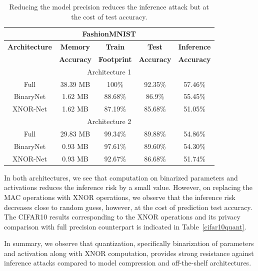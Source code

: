 \begin{table}[!htb]
\begin{center}
\renewcommand\arraystretch{1.5}
\fontsize{6.5pt}{6.5pt}\selectfont
\begin{tabular}{|c|c|c|c|c|}
\hline
\multicolumn{5}{|c|}{\textbf{FashionMNIST}}\\
\hline
\textbf{Architecture} & \textbf{Memory} & \textbf{Train}  & \textbf{Test}  & \textbf{Inference}  \\
 & \textbf{Accuracy} &  \textbf{Footprint} & \textbf{Accuracy} & \textbf{Accuracy}  \\
\hline
\multicolumn{5}{|c|}{Architecture 1}\\
Full & 38.39 MB & 100\% & 92.35\% & \cellcolor{red!25}57.46\%\\
BinaryNet & 1.62 MB & 88.68\% & 86.9\% & \cellcolor{green!25}55.45\%\\
XNOR-Net & 1.62 MB & 87.19\% & 85.68\% & \cellcolor{green!25}51.05\%\\ %
\hline
\multicolumn{5}{|c|}{Architecture 2}\\
Full & 29.83 MB & 99.34\% & 89.88\% & \cellcolor{red!25}54.86\% \\
BinaryNet & 0.93 MB & 97.61\% & 89.60\% & \cellcolor{green!25}54.30\%\\
XNOR-Net & 0.93 MB & 92.67\% & 86.68\% & \cellcolor{green!25}51.74\%\\ %
\hline
\end{tabular}
\end{center}
\caption{Reducing the model precision reduces the inference attack but at the cost of test accuracy.}
\label{fmnist_quantize}
\vspace{-4mm}
\end{table}

In both architectures, we see that computation on  binarized parameters and activations reduces the inference risk by a small value.
However, on replacing the MAC operations with XNOR operations, we observe that the inference risk decreases close to random guess, however, at the cost of prediction test accuracy.
The CIFAR10 results corresponding to the XNOR operations and its privacy comparison with full precision counterpart is indicated in Table~\ref{cifar10quant}.

In summary, we observe that quantization, specifically binarization of parameters and activation along with XNOR computation, provides strong resistance against inference attacks compared to model compression and off-the-shelf architectures.


